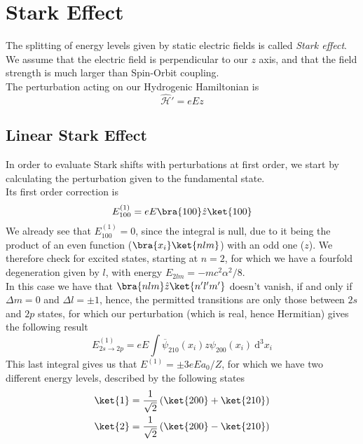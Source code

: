 \documentclass[a4paper, 11pt]{book}
\newcommand{\1}{\opr{\mathds{1}}}
\newcommand{\diff}[2][]{\ \mathrm{d}^{#1}#2}
\newcommand{\ham}{\mathcal{H}}
\newcommand{\opr}[1]{\hat{#1}}
\newcommand{\cc}[1]{\overline{#1}}
\theoremstyle{plain}
\begin{document}
	\section{Stark Effect}
	The splitting of energy levels given by static electric fields is called \textit{Stark effect}. We assume that the electric field is perpendicular to our $z$ axis, and that the field strength is much larger than Spin-Orbit coupling.\\
	The perturbation acting on our Hydrogenic Hamiltonian is
	\begin{equation}
		\opr{\ham}'=eEz
		\label{eq:starkpert}
	\end{equation}
	\subsection{Linear Stark Effect}
	In order to evaluate Stark shifts with perturbations at first order, we start by calculating the perturbation given to the fundamental state.\\
	Its first order correction is
	\begin{equation}
		E^{(1)}_{100}=eE\bra{100}\opr{z}\ket{100}
		\label{eq:starkgs}
	\end{equation}
	We already see that $E^{(1)}_{100}=0$, since the integral is null, due to it being the product of an even function ($\bra{x_i}\ket{nlm}$) with an odd one ($z$). We therefore check for excited states, starting at $n=2$, for which we have a fourfold degeneration given by $l$, with energy $E_{2lm}=-mc^2\alpha^2/8$.\\
	In this case we have that $\bra{nlm}\opr{z}\ket{n'l'm'}$ doesn't vanish, if and only if $\Delta m=0$ and $\Delta l=\pm1$, hence, the permitted transitions are only those between $2s$ and $2p$ states, for which our perturbation (which is real, hence Hermitian) gives the following result
	\begin{equation}
		E^{(1)}_{2s\to2p}=eE\int\cc{\psi}_{210}(x_i)z\psi_{200}(x_i)\diff[3]{x_i}
		\label{eq:energyshiftstarkeff}
	\end{equation}
	This last integral gives us that $E^{(1)}=\pm3eEa_0/Z$, for which we have two different energy levels, described by the following states
	\begin{equation}
		\begin{aligned}
			\ket{1}&=\frac{1}{\sqrt{2}}\left( \ket{200}+\ket{210} \right)\\
			\ket{2}&=\frac{1}{\sqrt{2}}\left( \ket{200}-\ket{210} \right)
		\end{aligned}
		\label{eq:eigenstateslinearstark}
	\end{equation}
\end{document}
